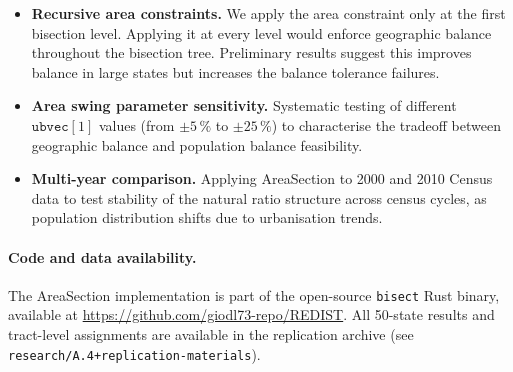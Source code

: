 \begin{itemize}
\item \textbf{Recursive area constraints.} We apply the area constraint only
  at the first bisection level. Applying it at every level would enforce
  geographic balance throughout the bisection tree.
  Preliminary results suggest this improves balance in large states but
  increases the balance tolerance failures.

\item \textbf{Area swing parameter sensitivity.} Systematic testing of
  different $\mathtt{ubvec}[1]$ values (from $\pm 5\,\%$ to $\pm 25\,\%$)
  to characterise the tradeoff between geographic balance and population
  balance feasibility.

\item \textbf{Multi-year comparison.} Applying AreaSection to 2000 and 2010
  Census data to test stability of the natural ratio structure across
  census cycles, as population distribution shifts due to urbanisation trends.
\end{itemize}

\paragraph{Code and data availability.}
The AreaSection implementation is part of the open-source \texttt{bisect}
Rust binary, available at \url{https://github.com/giodl73-repo/REDIST}.
All 50-state results and tract-level assignments are available in the
replication archive (see \texttt{research/A.4+replication-materials}).
